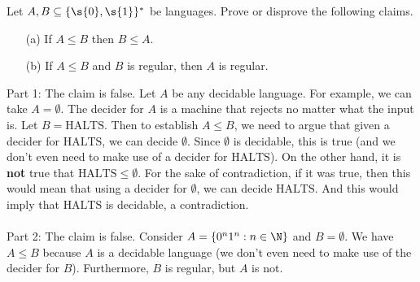 \begin{flex}
\label{grp:exercise:Practice-with-reduction-definition}

\begin{exercise}
\label{exercise:Practice-with-reduction-definition}
Let $A, B \subseteq \{\s{0},\s{1}\}^*$ be languages. Prove or disprove the following claims.
\begin{enumerate}
    \item[(a)] If $A \leq B$ then $B \leq A$.
    \item[(b)] If $A \leq B$ and $B$ is regular, then $A$ is regular. 
\end{enumerate}

\end{exercise}

\begin{solution}
\label{sol:Undecidable-Languages::claim}
Part 1: The claim is false. Let $A$ be any decidable language. For example, we can take $A = \emptyset$. The decider for $A$ is a machine that rejects no matter what the input is. Let $B = \text{HALTS}$. Then to establish $A \leq B$, we need to argue that given a decider for $\text{HALTS}$, we can decide $\emptyset$. Since $\emptyset$ is decidable, this is true (and we don't even need to make use of a decider for $\text{HALTS}$). On the other hand, it is \textbf{not} true that $\text{HALTS} \leq \emptyset$. For the sake of contradiction, if it was true, then this would mean that using a decider for $\emptyset$, we can decide $\text{HALTS}$. And this would imply that $\text{HALTS}$ is decidable, a contradiction.
\\\\
\noindent
Part 2: The claim is false. Consider $A = \{0^n1^n: n \in \N\}$ and $B = \emptyset$. We have $A \leq B$ because $A$ is a decidable language (we don't even need to make use of the decider for $B$). Furthermore, $B$ is regular, but $A$ is not.

\end{solution}
\end{flex}

